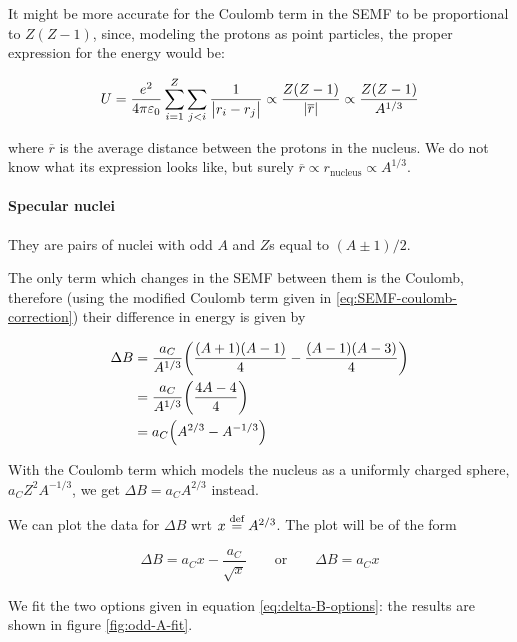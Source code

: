 \documentclass{article}
\begin{document}
It might be more accurate for the Coulomb term in the SEMF to be proportional to \(Z(Z-1)\), since, modeling the protons as point particles, the proper expression for the energy would be:

\begin{equation} \label{eq:SEMF-coulomb-correction}
    U = \frac{e^2}{4 \pi \varepsilon_0} \sum _{i=1}   ^{Z} \sum _{j<i} \frac{1}{\abs{r_i - r_j} }  \propto \frac{Z(Z-1)}{\abs{\overline{r} } }  \propto \frac{Z(Z-1)}{A^{1/3}}
\end{equation}

where \(\overline{r} \) is the average distance between the protons in the nucleus. We do not know what its expression looks like, but surely \(\overline{r} \propto r _{\text{nucleus}}  \propto A^{1/3}\).

\paragraph{Specular nuclei}

They are pairs of nuclei with odd \(A\) and \(Z\)s equal to \((A \pm 1)/2\).

The only term which changes in the SEMF between them is the Coulomb, therefore (using the modified Coulomb term given in \eqref{eq:SEMF-coulomb-correction}) their difference in energy is given by

\begin{subequations}
\begin{align}
  \Delta B  &= \frac{a_C}{A^{1/3}} \qty(\frac{(A+1)(A-1)}{4} - \frac{(A-1)(A-3)}{4})  \\
  &= \frac{a_C}{A^{1/3}} \qty(\frac{4A -4}{4})  \\
  &= a_C \qty(A^{2/3} - A^{-1/3})
\end{align}
\end{subequations}

With the Coulomb term which models the nucleus as a uniformly charged sphere, \(a_C Z^2 A^{-1/3}\), we get \(\Delta B = a_C A^{2/3}\) instead.

We can plot the data for \(\Delta B\) wrt \(x \stackrel{\text{def}}{=} A^{2/3}\). The plot will be of the form

\begin{equation} \label{eq:delta-B-options}
    \Delta B  = a_C x - \frac{a_C}{\sqrt{x}} \qquad \text{or} \qquad \Delta B = a_C x
\end{equation}

We fit the two options given in equation \eqref{eq:delta-B-options}: the results are shown in figure \ref{fig:odd-A-fit}.
\end{document}
